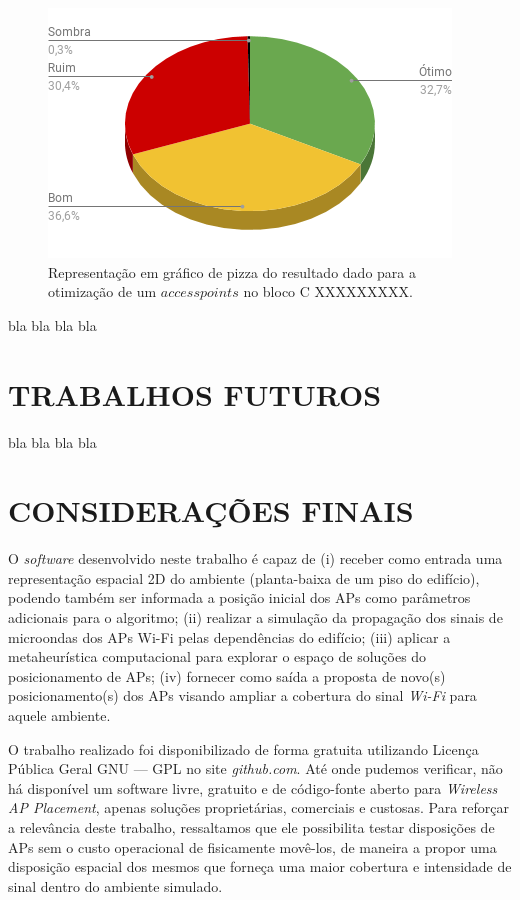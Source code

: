 \documentclass[
	12pt,				%
	twoside,			%
	a4paper,			%
	english,			%
	french,				%
	spanish,			%
	brazil				%
	]{abntex2}
\begin{document}
\begin{figure}[ht]
    \caption{\label{percent_bloco_a_3} Representação em gráfico de pizza do resultado dado para a otimização 
     de um $access points$ no bloco C XXXXXXXXX.}
    \begin{center}
        \includegraphics[scale=0.7]{imagens/percent-bloco-a-3.png}
    \end{center}
\end{figure}

bla bla bla bla

\chapter{TRABALHOS FUTUROS}\label{trabalhos-futuros}

bla bla bla bla

\chapter{CONSIDERAÇÕES FINAIS}\label{considerauxe7uxf5es-finais}

O \emph{software} desenvolvido neste trabalho é capaz de (i) receber
como entrada uma representação espacial 2D do ambiente (planta-baixa de
um piso do edifício), podendo também ser informada a posição inicial dos
APs como parâmetros adicionais para o algoritmo; (ii) realizar a
simulação da propagação dos sinais de microondas dos APs Wi-Fi pelas
dependências do edifício; (iii) aplicar a metaheurística computacional
para explorar o espaço de soluções do posicionamento de APs; (iv)
fornecer como saída a proposta de novo(s) posicionamento(s) dos APs
visando ampliar a cobertura do sinal \emph{Wi-Fi} para aquele ambiente.

O trabalho realizado foi disponibilizado de forma gratuita utilizando
Licença Pública Geral GNU --- GPL no site \emph{github.com}. Até onde
pudemos verificar, não há disponível um software livre, gratuito e de
código-fonte aberto para \emph{Wireless AP Placement}, apenas soluções
proprietárias, comerciais e custosas. Para reforçar a relevância deste
trabalho, ressaltamos que ele possibilita testar disposições de APs sem
o custo operacional de fisicamente movê-los, de maneira a propor uma
disposição espacial dos mesmos que forneça uma maior cobertura e
intensidade de sinal dentro do ambiente simulado.
\end{document}

